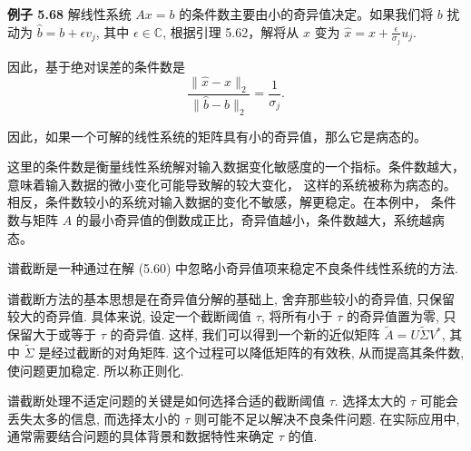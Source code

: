 \documentclass[a4paper]{ctexart}
\newcommand{\hl}[1]
{\noindent {\bf {#1}}}
\begin{document}
{\noindent \textbf{例子 5.68 } 解线性系统 \(Ax = b\) 的条件数主要由小的奇异值决定。如果我们将 \(b\) 扰动为 \(\hat{b} = b + \epsilon v_j\), 
其中 \(\epsilon \in \mathbb{C}\), 根据引理 5.62，解将从 \(x\) 变为 \(\hat{x} = x + \frac{\epsilon}{\sigma_j} u_j\).


因此，基于绝对误差的条件数是
\[
  \frac{\|\hat{x} - x\|_2}{\|\hat{b} - b\|_2} = \frac{1}{\sigma_j}.
\]

因此，如果一个可解的线性系统的矩阵具有小的奇异值，那么它是病态的。

这里的条件数是衡量线性系统解对输入数据变化敏感度的一个指标。条件数越大，意味着输入数据的微小变化可能导致解的较大变化，
这样的系统被称为病态的。相反，条件数较小的系统对输入数据的变化不敏感，解更稳定。在本例中，
条件数与矩阵 \(A\) 的最小奇异值的倒数成正比，奇异值越小，条件数越大，系统越病态。




\hl{定义5.63} 谱截断是一种通过在解 (5.60) 中忽略小奇异值项来稳定不良条件线性系统的方法. 

谱截断方法的基本思想是在奇异值分解的基础上, 舍弃那些较小的奇异值, 只保留较大的奇异值. 
具体来说, 设定一个截断阈值 $\tau$, 将所有小于 $\tau$ 的奇异值置为零, 
只保留大于或等于 $\tau$ 的奇异值. 这样, 我们可以得到一个新的近似矩阵 
$\tilde{A} = U\tilde{\Sigma} V^*$, 其中 $\tilde{\Sigma}$ 是经过截断的对角矩阵. 
这个过程可以降低矩阵的有效秩, 从而提高其条件数, 使问题更加稳定. 所以称正则化.

谱截断处理不适定问题的关键是如何选择合适的截断阈值 $\tau$. 
选择太大的 $\tau$ 可能会丢失太多的信息, 而选择太小的 $\tau$ 则可能不足以解决不良条件问题. 
在实际应用中, 通常需要结合问题的具体背景和数据特性来确定 $\tau$ 的值. 

}
\end{document}
